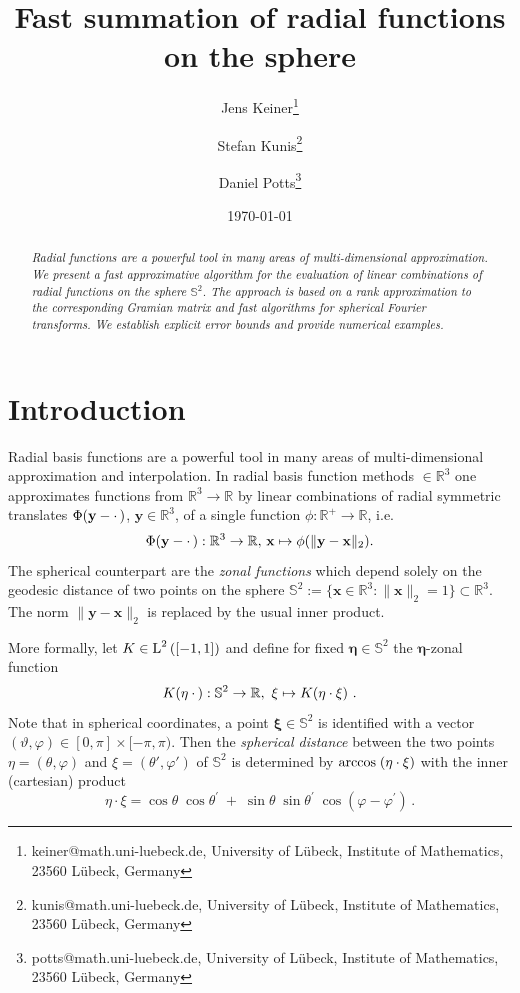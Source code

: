 \documentclass[11pt,a4paper,twoside,bibtotoc]{scrartcl}
\title{Fast summation of radial functions on the sphere}
\date{\today}
\author{
Jens Keiner\thanks{keiner@math.uni-luebeck.de, University of
  L\"ubeck, Institute of Mathematics, 23560 L\"ubeck, Germany} \and
Stefan Kunis\thanks{kunis@math.uni-luebeck.de, University of
  L\"ubeck, Institute of Mathematics, 23560 L\"ubeck, Germany} \and
Daniel Potts\thanks{potts@math.uni-luebeck.de, University of
  L\"ubeck, Institute of Mathematics, 23560 L\"ubeck, Germany} 
}
\theoremstyle{plain}
\theoremstyle{definition}
\theoremstyle{remark}
\newcommand{\R}{\ensuremath{\mathbb{R}}}
\newcommand{\Ln}[2]{\ensuremath{\text{\rm{L}}^{#1}\left(#2\right)}}
\newcommand{\fun}[2]{\ensuremath{#1{\hspace{-0.4ex}}\left(#2\right)}}
\numberwithin{equation}{section}
\numberwithin{table}{section}
\numberwithin{figure}{section}
\begin{document}
\maketitle

\begin{abstract}
\medskip
\noindent
{\it Radial functions are a powerful tool in many areas of multi-dimensional 
approximation. We present a fast approximative algorithm for the evaluation of
linear combinations of radial functions on the sphere $\mathbb{S}^2$. The 
approach is based on a rank approximation to the corresponding Gramian matrix
and fast algorithms for spherical Fourier transforms. We establish explicit error 
bounds and provide numerical examples.}
\end{abstract}

\section{Introduction}\label{sect:1}
Radial basis functions are a powerful tool in many areas of multi-dimensional 
approximation and interpolation.
In radial basis function methods $\in \R^3$ one approximates functions
from $\R^3 
\rightarrow \R$ by linear combinations of radial symmetric translates 
$\fun{\Phi}{\mathbf{y} - \cdot \,}$, $\mathbf{y} \in \R^3$, of a single function $\phi : \R^{+} \rightarrow \R$, i.e. 
\[
  \fun{\Phi}{\mathbf{y} - \cdot \,}:\R^3 \rightarrow \R, \, \mathbf{x} \mapsto \phi(\|\mathbf{y} - \mathbf{x}\|_2).
\]
The spherical counterpart are the \emph{zonal functions} which depend solely
on the geodesic distance of two points on the sphere $\mathbb{S}^2:=\{
\mathbf{x} \in \mathbb{R}^3: \|\mathbf{x}\|_2=1\} \subset \R^3$. The norm $\|\mathbf{y} - \mathbf{x}\|_2$ 
is replaced by the usual inner product.

More formally, let $K \in \Ln{2}{[-1,1]}$ and define for fixed
$\mathbf{\eta} \in \mathbb{S}^2$ the $\mathbf{\eta}$-zonal function 
\[
  \fun{K}{\mathbf{\eta} \: \cdot \,}: \mathbb{S}^2 \rightarrow \R,\ \mathbf{\xi} \mapsto
  \fun{K}{\mathbf{\eta} \cdot \mathbf{\xi}}\,.%
\]
Note that in spherical coordinates, a point $\mathbf{\xi} \in \mathbb{S}^2$ is identified with 
a vector $(\vartheta,\varphi) \in [0,\pi] \times [-\pi,\pi)$. 
Then the {\it spherical distance} between the two points 
$\eta=(\theta,\varphi)$ and $\xi=(\theta',\varphi')$ of $\mathbb{S}^2$ is
determined by
$
{\rm arccos}\;  (\eta\cdot \xi)                     
$
with the inner (cartesian) product 
$$
\eta\cdot \xi = \cos\theta\; \cos \theta^\prime \; +\; \sin\theta\; \sin
\theta^\prime\;\cos(\varphi-\varphi^\prime)\, .
$$
\end{document}
